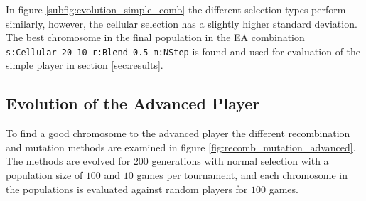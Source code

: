 \documentclass{llncs}
\begin{document}
In figure \ref{subfig:evolution_simple_comb} the different selection types perform similarly, however, the cellular selection has a slightly higher standard deviation. The best chromosome in the final population in the EA combination \texttt{s:Cellular-20-10 r:Blend-0.5 m:NStep} is found and used for evaluation of the simple player in section \ref{sec:results}.

\subsection{Evolution of the Advanced Player}
To find a good chromosome to the advanced player the different recombination and mutation methods are examined in figure \ref{fig:recomb_mutation_advanced}. The methods are evolved for $200$ generations with normal selection with a population size of $100$ and $10$ games per tournament, and each chromosome in the populations is evaluated against random players for $100$ games.  
\end{document}
